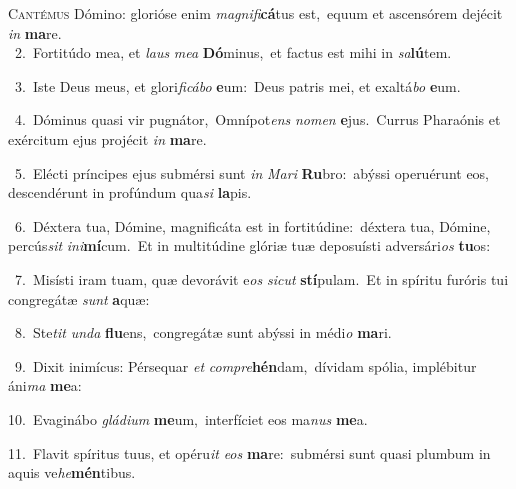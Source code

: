 \lettrine{\initial\textcolor{\initialcolor}{C}}{antémus} Dómino: glorióse enim \textit{ma}\-\textit{gni}\textit{fi}\textbf{cá}tus est,~\star equum et ascensórem dejécit \textit{in} \textbf{ma}\-re.\\
{\numbfont\textcolor{\numbcolor}{~2.}}~Fortitúdo mea, et \textit{laus} \textit{me}\-\textit{a} \textbf{Dó}\-minus,~\star et factus est mihi in \textit{sa}\-\textbf{lú}tem.\par
{\numbfont\textcolor{\numbcolor}{~3.}}~Iste Deus meus, et glori\-\textit{fi}\-\textit{cá}\textit{bo} \textbf{e}\-um:~\star Deus patris mei, et exaltá\textit{bo} \textbf{e}\-um.\par
{\numbfont\textcolor{\numbcolor}{~4.}}~Dóminus quasi vir pugnátor,~\dagger Omnípot\textit{ens} \textit{no}\-\textit{men} \textbf{e}\-jus.~\star Currus Pharaónis et exércitum ejus projécit \textit{in} \textbf{ma}\-re.\par
{\numbfont\textcolor{\numbcolor}{~5.}}~Elécti príncipes ejus submérsi sunt \textit{in} \textit{Ma}\-\textit{ri} \textbf{Ru}\-bro:~\star abýssi operuérunt eos, descendérunt in profúndum qua\textit{si} \textbf{la}\-pis.\par
{\numbfont\textcolor{\numbcolor}{~6.}}~Déxtera tua, Dómine, magnificáta est in fortitúdine:~\dagger déxtera tua, Dómine, percús\textit{sit} \textit{in}\-\textit{i}\textbf{mí}cum.~\star Et in multitúdine glóriæ tuæ deposuísti adversári\textit{os} \textbf{tu}\-os:\par
{\numbfont\textcolor{\numbcolor}{~7.}}~Misísti iram tuam, quæ devorávit e\textit{os} \textit{sic}\-\textit{ut} \textbf{stí}\-pulam.~\star Et in spíritu furóris tui congregátæ \textit{sunt} \textbf{a}\-quæ:\par
{\numbfont\textcolor{\numbcolor}{~8.}}~Ste\textit{tit} \textit{un}\-\textit{da} \textbf{flu}\-ens,~\star congregátæ sunt abýssi in médi\textit{o} \textbf{ma}\-ri.\par
{\numbfont\textcolor{\numbcolor}{~9.}}~Dixit inimícus: Pérsequar \textit{et} \textit{com}\-\textit{pre}\textbf{hén}dam,~\star dívidam spólia, implébitur áni\textit{ma} \textbf{me}\-a:\par
{\numbfont\textcolor{\numbcolor}{10.}}~Evaginábo \textit{glá}\-\textit{di}\textit{um} \textbf{me}\-um,~\star interfíciet eos ma\textit{nus} \textbf{me}\-a.\par
{\numbfont\textcolor{\numbcolor}{11.}}~Flavit spíritus tuus, et opéru\textit{it} \textit{e}\-\textit{os} \textbf{ma}\-re:~\star submérsi sunt quasi plumbum in aquis ve\-\textit{he}\-\textbf{mén}tibus.\par
